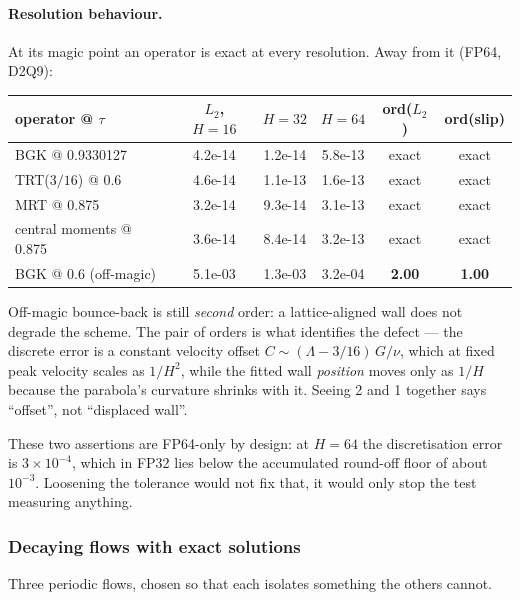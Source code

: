\documentclass[11pt,a4paper]{article}
\begin{document}
\paragraph{Resolution behaviour.} At its magic point an operator is exact at every
resolution. Away from it (FP64, D2Q9):

\begin{center}\small
\begin{tabular}{lccccc}
\toprule
operator @ $\tau$ & $L_2$, $H{=}16$ & $H{=}32$ & $H{=}64$ & ord($L_2$) & ord(slip) \\
\midrule
BGK @ 0.9330127        & 4.2e-14 & 1.2e-14 & 5.8e-13 & exact & exact \\
TRT($3/16$) @ 0.6      & 4.6e-14 & 1.1e-13 & 1.6e-13 & exact & exact \\
MRT @ 0.875            & 3.2e-14 & 9.3e-14 & 3.1e-13 & exact & exact \\
central moments @ 0.875& 3.6e-14 & 8.4e-14 & 3.2e-13 & exact & exact \\
BGK @ 0.6 (off-magic)  & 5.1e-03 & 1.3e-03 & 3.2e-04 & \textbf{2.00} & \textbf{1.00} \\
\bottomrule
\end{tabular}
\end{center}

\noindent Off-magic bounce-back is still \emph{second} order: a lattice-aligned
wall does not degrade the scheme. The pair of orders is what identifies the
defect --- the discrete error is a constant velocity offset
$C \sim (\Lambda-3/16)\,G/\nu$, which at fixed peak velocity scales as $1/H^2$,
while the fitted wall \emph{position} moves only as $1/H$ because the parabola's
curvature shrinks with it. Seeing 2 and 1 together says ``offset'', not
``displaced wall''.

These two assertions are FP64-only by design: at $H=64$ the discretisation error
is $3\times10^{-4}$, which in FP32 lies below the accumulated round-off floor of
about $10^{-3}$. Loosening the tolerance would not fix that, it would only stop
the test measuring anything.
\subsubsection{Decaying flows with exact solutions}

Three periodic flows, chosen so that each isolates something the others cannot.
\end{document}
